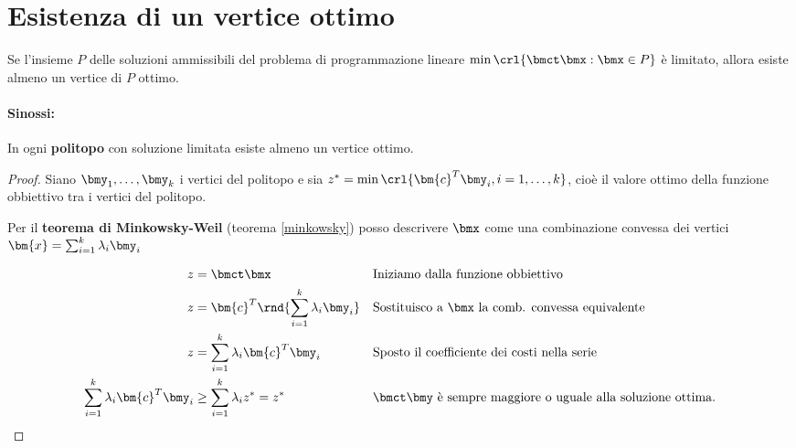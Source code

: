 \documentclass[\main/main.tex]{subfiles}
\begin{document}
\section{Esistenza di un vertice ottimo}

\begin{theorem}
  Se l'insieme $P$ delle soluzioni ammissibili del problema di programmazione lineare $\min\crl{\bmct\bmx:\bmx\in P}$ è limitato, allora esiste almeno un vertice di $P$ ottimo.
  \paragraph*{Sinossi:} In ogni \textbf{politopo} con soluzione limitata esiste almeno un vertice ottimo.
\end{theorem}

\begin{proof}
  Siano $\bmy_1, \ldots, \bmy_k$ i vertici del politopo e sia $z^* = \min \crl{\bm{c}^T\bmy_i, i=1,\ldots,k}$, cioè il valore ottimo della funzione obbiettivo tra i vertici del politopo.

  Per il \textbf{teorema di Minkowsky-Weil} (teorema \ref{minkowsky}) posso descrivere $\bmx$ come una combinazione convessa dei vertici $\bm{x} = \sum_{i=1}^k \lambda_i \bmy_i$

  \begin{align*}
    z                                     & = \bmct \bmx                                  &  & \text{Iniziamo dalla funzione obbiettivo}                             \\
    z                                     & = \bm{c}^T\rnd{\sum_{i=1}^k \lambda_i \bmy_i} &  & \text{Sostituisco a $\bmx$ la comb. convessa equivalente}             \\
    z                                     & = \sum_{i=1}^k \lambda_i \bm{c}^T\bmy_i       &  & \text{Sposto il coefficiente dei costi nella serie}                   \\
    \sum_{i=1}^k \lambda_i \bm{c}^T\bmy_i & \geq \sum_{i=1}^k  \lambda_i z^* = z^*        &  & \text{$\bmct \bmy$ è sempre maggiore o uguale alla soluzione ottima.} \\
  \end{align*}
\end{proof}
\end{document}
